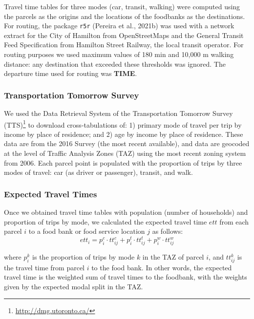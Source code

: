 \documentclass[]{elsarticle} %
\begin{document}
Travel time tables for three modes (car, transit, walking) were computed
using the parcels as the origins and the locations of the foodbanks as
the destinations. For routing, the package \texttt{r5r} (Pereira et al.,
2021b) was used with a network extract for the City of Hamilton from
OpenStreetMaps and the General Transit Feed Specification from Hamilton
Street Railway, the local transit operator. For routing purposes we used
maximum values of 180 min and 10,000 m walking distance: any destination
that exceeded these thresholds was ignored. The departure time used for
routing was \textbf{TIME}.

\hypertarget{transportation-tomorrow-survey}{%
\subsubsection{Transportation Tomorrow
Survey}\label{transportation-tomorrow-survey}}

We used the Data Retrieval System of the Transportation Tomorrow Survey
(TTS)\footnote{\url{http://dmg.utoronto.ca/}} to download
cross-tabulations of: 1) primary mode of travel per trip by income by
place of residence; and 2) age by income by place of residence. These
data are from the 2016 Survey (the most recent available), and data are
geocoded at the level of Traffic Analysis Zones (TAZ) using the most
recent zoning system from 2006. Each parcel point is populated with the
proportion of trips by three modes of travel: car (as driver or
passenger), transit, and walk.

\hypertarget{expected-travel-times}{%
\subsubsection{Expected Travel Times}\label{expected-travel-times}}

Once we obtained travel time tables with population (number of
households) and proportion of trips by mode, we calculated the expected
travel time \(ett\) from each parcel \(i\) to a food bank or food
service location \(j\) as follows: \[
ett_i = p^c_i\cdot tt^c_{ij} + p^t_i\cdot tt^t_{ij} + p^w_i\cdot tt^w_{ij}
\]

\noindent where \(p^k_i\) is the proportion of trips by mode \(k\) in
the TAZ of parcel \(i\), and \(tt^k_{ij}\) is the travel time from
parcel \(i\) to the food bank. In other words, the expected travel time
is the weighted sum of travel times to the foodbank, with the weights
given by the expected modal split in the TAZ.
\end{document}
